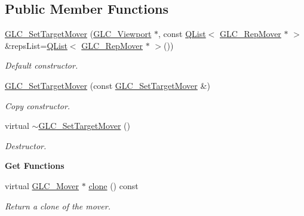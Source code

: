 \subsection*{Public Member Functions}
\begin{DoxyCompactItemize}
\item 
\hyperlink{class_g_l_c___set_target_mover_a2fcce0aadc8bbd2c062ad5d4b022f40d}{G\-L\-C\-\_\-\-Set\-Target\-Mover} (\hyperlink{class_g_l_c___viewport}{G\-L\-C\-\_\-\-Viewport} $\ast$, const \hyperlink{class_q_list}{Q\-List}$<$ \hyperlink{class_g_l_c___rep_mover}{G\-L\-C\-\_\-\-Rep\-Mover} $\ast$ $>$ \&reps\-List=\hyperlink{class_q_list}{Q\-List}$<$ \hyperlink{class_g_l_c___rep_mover}{G\-L\-C\-\_\-\-Rep\-Mover} $\ast$ $>$())
\begin{DoxyCompactList}\small\item\em Default constructor. \end{DoxyCompactList}\item 
\hyperlink{class_g_l_c___set_target_mover_a04340479343a6e24ab7ada6c7e588991}{G\-L\-C\-\_\-\-Set\-Target\-Mover} (const \hyperlink{class_g_l_c___set_target_mover}{G\-L\-C\-\_\-\-Set\-Target\-Mover} \&)
\begin{DoxyCompactList}\small\item\em Copy constructor. \end{DoxyCompactList}\item 
virtual \hyperlink{class_g_l_c___set_target_mover_aede999671a22a3b8366ad79af4110be7}{$\sim$\-G\-L\-C\-\_\-\-Set\-Target\-Mover} ()
\begin{DoxyCompactList}\small\item\em Destructor. \end{DoxyCompactList}\end{DoxyCompactItemize}
\begin{Indent}{\bf Get Functions}\par
\begin{DoxyCompactItemize}
\item 
virtual \hyperlink{class_g_l_c___mover}{G\-L\-C\-\_\-\-Mover} $\ast$ \hyperlink{class_g_l_c___set_target_mover_a45eab18ffcb8f601d6081c011f67909a}{clone} () const 
\begin{DoxyCompactList}\small\item\em Return a clone of the mover. \end{DoxyCompactList}\end{DoxyCompactItemize}
\end{Indent}
